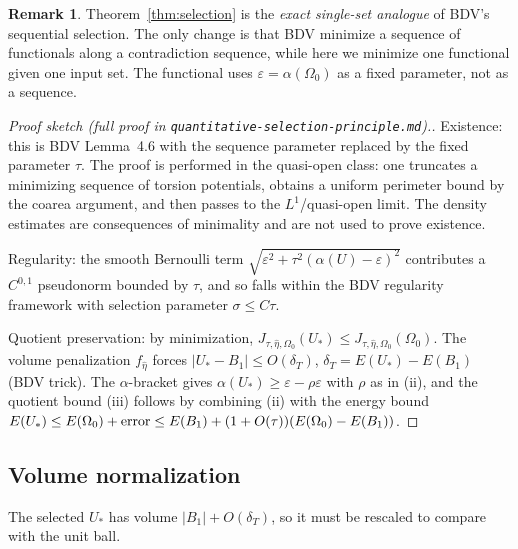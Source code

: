 \documentclass[11pt]{amsart}
\theoremstyle{definition}
\newtheorem{remark}[theorem]{Remark}
\newcommand{\abs}[1]{\left|#1\right|}
\begin{document}
\begin{remark}
Theorem~\ref{thm:selection} is the \emph{exact single-set analogue} of BDV's
sequential selection. The only change is that BDV minimize a sequence of
functionals along a contradiction sequence, while here we minimize one
functional given one input set. The functional uses $\varepsilon=\alpha(\Omega_0)$
as a fixed parameter, not as a sequence.
\end{remark}

\begin{proof}[Proof sketch (full proof in \texttt{quantitative-selection-principle.md}).]
Existence: this is BDV Lemma~4.6 with the sequence parameter replaced by the
fixed parameter $\tau$. The proof is performed in the quasi-open class:
one truncates a minimizing sequence of torsion potentials, obtains a uniform
perimeter bound by the coarea argument, and then passes to the $L^1$/quasi-open
limit. The density estimates are consequences of minimality and are not used
to prove existence.

Regularity: the smooth Bernoulli term
$\sqrt{\varepsilon^2+\tau^2(\alpha(U)-\varepsilon)^2}$
contributes a $C^{0,1}$ pseudonorm bounded by $\tau$, and so falls within
the BDV regularity framework with selection parameter $\sigma\le C\tau$.

Quotient preservation: by minimization, $J_{\tau,\hat\eta,\Omega_0}(U_*)\le
J_{\tau,\hat\eta,\Omega_0}(\Omega_0)$. The volume penalization $f_{\hat\eta}$
forces $\abs{U_*-B_1}\le O(\delta_T)$, $\delta_T=E(U_*)-E(B_1)$ (BDV trick).
The $\alpha$-bracket gives
$\alpha(U_*)\ge\varepsilon-\rho\varepsilon$ with $\rho$ as in (ii), and the
quotient bound (iii) follows by combining (ii) with the energy bound
$E(U_*)\le E(\Omega_0)+\hbox{error}\le E(B_1)+(1+O(\tau))(E(\Omega_0)-E(B_1))$.
\end{proof}

\subsection{Volume normalization}\label{sec:volnorm}

The selected $U_*$ has volume $\abs{B_1}+O(\delta_T)$, so it must be
rescaled to compare with the unit ball.
\end{document}
